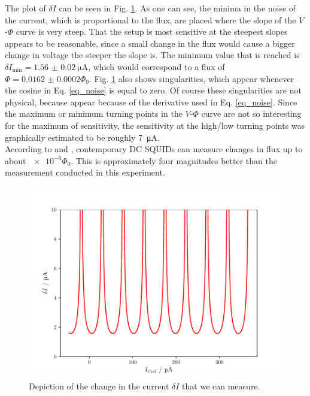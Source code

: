 \documentclass[a4paper,10pt]{article}
\begin{document}
The plot of $\delta I$ can be seen in Fig. \ref{fig_noise}. As one can see, the minima in the noise of the current, which is proportional to the flux, are placed where the slope of the $V$-$\Phi$ curve is very steep. That the setup is most sensitive at the steepest slopes appears to be reasonable, since a small change in the flux would cause a bigger change in voltage the steeper the slope is. The minimum value that is reached is $\delta I_\mathrm{min} = \SI{1.56(2)}{\micro \ampere}$, which would correspond to a flux of $\Phi = \num{0.0162(2)} \Phi_0$. Fig. \ref{fig_noise} also shows singularities, which appear whenever the cosine in Eq. \ref{eq_noise} is equal to zero. Of course these singularities are not physical, because appear because of the derivative used in Eq. \ref{eq_noise}. Since the maximum or minimum turning points in the $V$-$\Phi$ curve are not so interesting for the maximum of sensitivity, the sensitivity at the high/low turning points was graphically estimated to be roughly \SI{7}{\micro \ampere}. 
\\
According to \cite{drung} and \cite{kleiner}, contemporary DC SQUIDs can measure changes in flux up to about $\num{e-6} \Phi_0$. This is approximately four magnitudes better than the measurement conducted in this experiment. 
\begin{figure}[htp!]
    \centering
    \includegraphics[width = 0.6 \textwidth]{noise.pdf}
    \caption{Depiction of the change in the current $\delta I$ that we can measure.}
    \label{fig_noise}
\end{figure}
\end{document}
